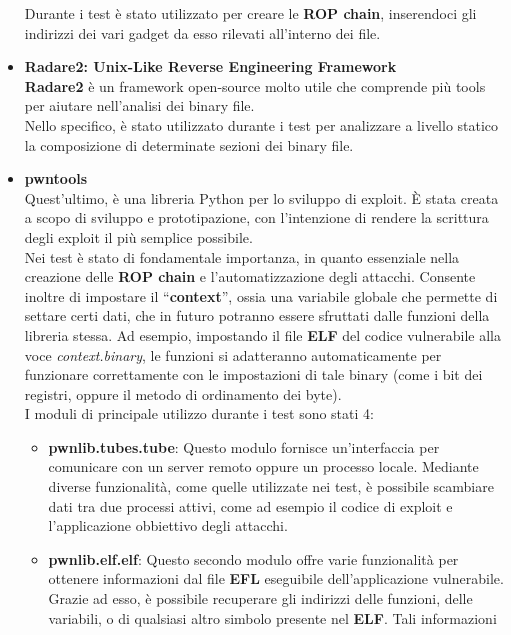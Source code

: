 \begin{itemize}
              Durante i test è stato utilizzato per creare le \textbf{ROP chain}, inserendoci gli indirizzi dei vari gadget da esso rilevati all'interno dei file.
        \item \label{Radare2}\textbf{Radare2: Unix-Like Reverse Engineering Framework} \cite*{Radare2}\\
              \textbf{Radare2} è un framework open-source molto utile che comprende più tools per aiutare nell'analisi dei binary file.\\
              Nello specifico, è stato utilizzato durante i test per analizzare a livello statico la composizione di determinate sezioni dei binary file.
        \item \label{pwntools}\textbf{pwntools} \cite*{pwntools}\\
              Quest'ultimo, è una libreria Python per lo sviluppo di exploit. È stata creata a scopo di sviluppo e prototipazione, con l'intenzione di rendere la scrittura degli exploit il più semplice possibile.\\
              Nei test è stato di fondamentale importanza, in quanto essenziale nella creazione delle \textbf{ROP chain} e l'automatizzazione degli attacchi. Consente inoltre di impostare il ``\textbf{context}'', ossia una variabile globale che permette di settare certi dati, che in futuro potranno essere sfruttati dalle funzioni della libreria stessa. 
              Ad esempio, impostando il file \textbf{ELF} del codice vulnerabile alla voce \textit{context.binary}, le funzioni si adatteranno automaticamente per funzionare correttamente con le impostazioni di tale binary (come i bit dei registri, oppure il metodo di ordinamento dei byte).\\
              I moduli di principale utilizzo durante i test sono stati 4:
              \begin{itemize}
                      \item \textbf{pwnlib.tubes.tube}: Questo modulo fornisce un'interfaccia per comunicare con un server remoto oppure un processo locale. Mediante diverse funzionalità, come quelle utilizzate nei test, è possibile scambiare dati tra due processi attivi, come ad esempio il codice di exploit e l'applicazione obbiettivo degli attacchi.
                      \item \textbf{pwnlib.elf.elf}: Questo secondo modulo offre varie funzionalità per ottenere informazioni dal file \textbf{EFL} eseguibile dell'applicazione vulnerabile. Grazie ad esso, è possibile recuperare gli indirizzi delle funzioni, delle variabili, o di qualsiasi altro simbolo presente nel \textbf{ELF}. Tali informazioni 

\end{itemize}
\end{itemize}
